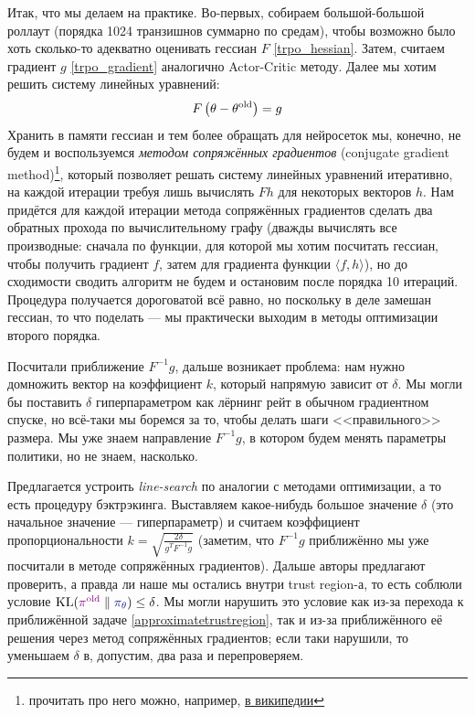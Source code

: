 Итак, что мы делаем на практике. Во-первых, собираем большой-большой роллаут (порядка 1024 транзишнов суммарно по средам), чтобы возможно было хоть сколько-то адекватно оценивать гессиан $F$ \eqref{trpo_hessian}. Затем, считаем градиент $g$ \eqref{trpo_gradient} аналогично Actor-Critic методу. Далее мы хотим решить систему линейных уравнений:
$$F \left(\theta - \theta^{\mathrm{old}}\right) = g$$
Хранить в памяти гессиан и тем более обращать для нейросеток мы, конечно, не будем и воспользуемся \emph{методом сопряжённых градиентов} (conjugate gradient method)\footnote{прочитать про него можно, например, \href{https://ru.wikipedia.org/wiki/Метод_сопряжённых_градиентов_(для_решения_СЛАУ)}{в википедии}}, который позволяет решать систему линейных уравнений итеративно, на каждой итерации требуя лишь вычислять $Fh$ для некоторых векторов $h$. Нам придётся для каждой итерации метода сопряжённых градиентов сделать два обратных прохода по вычислительному графу (дважды вычислять все производные: сначала по функции, для которой мы хотим посчитать гессиан, чтобы получить градиент $f$, затем для градиента функции $\langle f, h \rangle$), но до сходимости сводить алгоритм не будем и остановим после порядка 10 итераций. Процедура получается дороговатой всё равно, но поскольку в деле замешан гессиан, то что поделать --- мы практически выходим в методы оптимизации второго порядка.

Посчитали приближение $F^{-1}g$, дальше возникает проблема: нам нужно домножить вектор на коэффициент $k$, который напрямую зависит от $\delta$. Мы могли бы поставить $\delta$ гиперпараметром как лёрнинг рейт в обычном градиентном спуске, но всё-таки мы боремся за то, чтобы делать шаги <<правильного>> размера. Мы уже знаем направление $F^{-1}g$, в котором будем менять параметры политики, но не знаем, насколько.

Предлагается устроить \emph{line-search} по аналогии с методами оптимизации, а то есть процедуру бэктрэкинга. Выставляем какое-нибудь большое значение $\delta$ (это начальное значение --- гиперпараметр) и считаем коэффициент пропорциональности $k = \sqrt{\frac{2 \delta}{g^TF^{-1}g}}$ (заметим, что $F^{-1}g$ приближённо мы уже посчитали в методе сопряжённых градиентов). Дальше авторы предлагают проверить, а правда ли наше мы остались внутри trust region-а, то есть соблюли условие $\KL(\textcolor{ChadPurple}{\pi^{\old}} \parallel \textcolor{ChadBlue}{\pi_\theta}) \HM\le \delta$. Мы могли нарушить это условие как из-за перехода к приближённой задаче \eqref{approximatetrustregion}, так и из-за приближённого её решения через метод сопряжённых градиентов; если таки нарушили, то уменьшаем $\delta$ в, допустим, два раза и перепроверяем.

